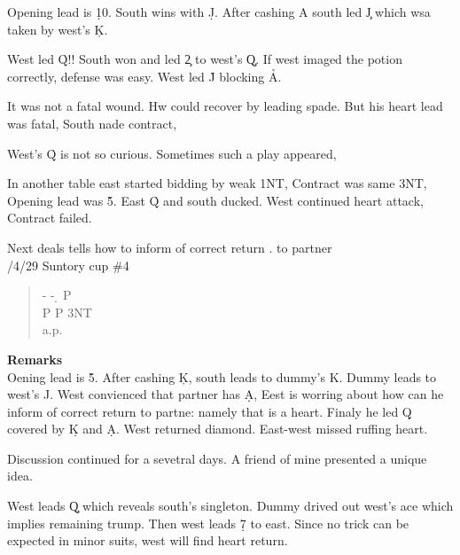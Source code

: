 Opening lead is \d 10. South wins with \d J. After
cashing \s A south led \c J which wsa taken by west's
\c K. 

West led \h Q!! South won and led \c 2 to west's \c Q.
If west imaged the potion correctly, defense was easy.
West led \h J blocking \h A.

It was not a fatal wound. Hw could recover by leading spade.
But his heart lead was fatal, South nade contract,

West's \h Q is not so curious. Sometimes such a play appeared,

In another table east started bidding by weak 1NT, Contract was same 
3NT, Opening lead was \h 5. East \h Q and south ducked. West
continued heart attack, Contract failed.
\vspace{0.5cm}

Next deals tells  how to inform of correct return .
to partner\\

/4/29 Suntory cup \#4
\begin{quote}
%
  {}%
  {}
  {}%
  {}%
\end{quote}
\begin{quote}
\begin{bidding}
- \> -  \d \> P  \\
P \s \> P \> 3NT\\
a.p.
\end{bidding}
\end{quote}
{\bf Remarks}\\

Oening lead is \h 5. After cashing \c K, south leads
 to dummy's \s K. Dummy leads  to west's \s J.
West convienced that partner has \d A, Eest is worring about
how can he inform of correct return to partne: 
namely that is a heart. Finaly he led \d Q  covered by \d K and \d A.
West returned diamond. East-west missed ruffing heart.

Discussion continued for a sevetral days. A friend of mine
presented a unique idea.

West leads \c Q which reveals south's singleton. Dummy drived out
west's ace which implies remaining trump. Then west leads \d 7 to east.
Since no trick can be expected in minor suits, west will find heart return.

